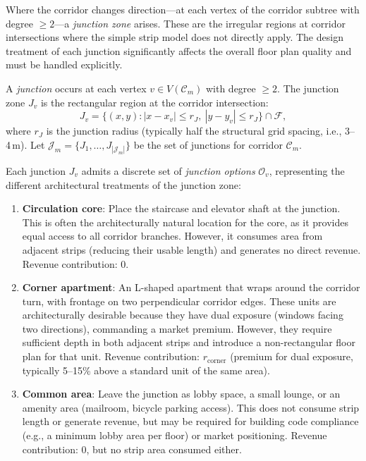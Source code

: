\documentclass[11pt,a4paper]{article}
\newcommand{\calF}{\mathcal{F}}
\newcommand{\calC}{\mathcal{C}}
\newcommand{\calJ}{\mathcal{J}}
\newcommand{\calO}{\mathcal{O}}
\begin{document}
Where the corridor changes direction---at each vertex of the corridor
subtree with degree $\geq 2$---a \emph{junction zone} arises. These
are the irregular regions at corridor intersections where the simple
strip model does not directly apply. The design treatment of each
junction significantly affects the overall floor plan quality and must
be handled explicitly.

A \emph{junction} occurs at each vertex $v \in V(\calC_m)$ with degree
$\geq 2$. The junction zone $J_v$ is the rectangular region at the
corridor intersection:
\begin{equation}
    J_v = \bigl\{(x,y) : |x - x_v| \leq r_J,\ |y - y_v| \leq r_J\bigr\} \cap \calF,
\end{equation}
where $r_J$ is the junction radius (typically half the structural grid
spacing, i.e., 3--4\,m). Let $\calJ_m = \{J_1, \ldots, J_{|\calJ_m|}\}$
be the set of junctions for corridor $\calC_m$.

Each junction $J_v$ admits a discrete set of \emph{junction options}
$\calO_v$, representing the different architectural treatments of the
junction zone:
\begin{enumerate}[label=(\alph*)]
    \item \textbf{Circulation core}: Place the staircase and elevator
    shaft at the junction. This is often the architecturally natural
    location for the core, as it provides equal access to all corridor
    branches. However, it consumes area from adjacent strips (reducing
    their usable length) and generates no direct revenue.
    Revenue contribution: $0$.

    \item \textbf{Corner apartment}: An L-shaped apartment that wraps
    around the corridor turn, with frontage on two perpendicular
    corridor edges. These units are architecturally desirable because
    they have dual exposure (windows facing two directions), commanding
    a market premium. However, they require sufficient depth in both
    adjacent strips and introduce a non-rectangular floor plan for that
    unit. Revenue contribution: $r_{\text{corner}}$ (premium for dual
    exposure, typically 5--15\% above a standard unit of the same area).

    \item \textbf{Common area}: Leave the junction as lobby space, a
    small lounge, or an amenity area (mailroom, bicycle parking access).
    This does not consume strip length or generate revenue, but may be
    required for building code compliance (e.g., a minimum lobby area
    per floor) or market positioning.
    Revenue contribution: $0$, but no strip area consumed either.
\end{enumerate}
\end{document}
